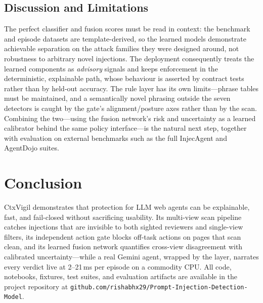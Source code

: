 \documentclass[journal]{IEEEtran}
\begin{document}
\subsection{Discussion and Limitations}
The perfect classifier and fusion scores must be read in context: the
benchmark and episode datasets are template-derived, so the learned models
demonstrate achievable separation on the attack families they were designed
around, not robustness to arbitrary novel injections. The deployment
consequently treats the learned components as \emph{advisory} signals and
keeps enforcement in the deterministic, explainable path, whose behaviour is
asserted by contract tests rather than by held-out accuracy. The rule layer
has its own limits---phrase tables must be maintained, and a semantically
novel phrasing outside the seven detectors is caught by the gate's
alignment/posture axes rather than by the scan. Combining the two---using
the fusion network's risk and uncertainty as a learned calibrator behind the
same policy interface---is the natural next step, together with evaluation
on external benchmarks such as the full InjecAgent and AgentDojo suites.

\section{Conclusion}
CtxVigil demonstrates that protection for LLM web agents can be explainable,
fast, and fail-closed without sacrificing usability. Its multi-view scan
pipeline catches injections that are invisible to both sighted reviewers and
single-view filters, its independent action gate blocks off-task actions on
pages that scan clean, and its learned fusion network quantifies cross-view
disagreement with calibrated uncertainty---while a real Gemini agent,
wrapped by the layer, narrates every verdict live at 2--21\,ms per episode
on a commodity CPU. All code, notebooks, fixtures, test suites, and
evaluation artifacts are available in the project repository at
\texttt{github.com/rishabhx29/}\allowbreak\texttt{Prompt-Injection-Detection-Model}.
\end{document}
